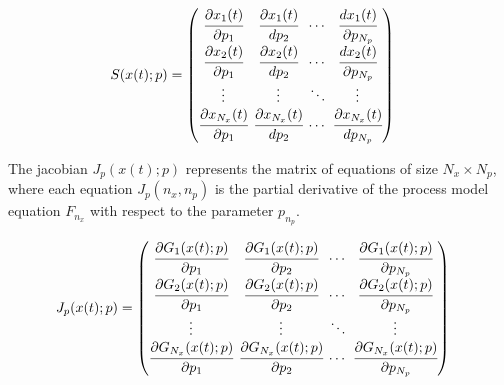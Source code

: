 \documentclass[../Article_Model_Parameters.tex]{subfiles}
\begin{document}
	{\footnotesize
		\begin{equation}
			\begin{split}
				{S}({x}(t);{p}) & = 
				\begingroup %
				\setlength\arraycolsep{2pt}
				\begin{pmatrix}
					\cfrac{\partial {x_{1}}(t)}{\partial {p_{1}}} 	& \cfrac{\partial {x_{1}}(t)}{d {p_{2}}}     & \cdots & \cfrac{d {x_{1}}(t)}{\partial {p_{N_p}}}\\
					\cfrac{\partial {x_{2}}(t)}{\partial {p_{1}}} 	& \cfrac{\partial {x_{2}}(t)}{d {p_{2}}}     & \cdots & \cfrac{d {x_{2}}(t)}{\partial {p_{N_p}}}\\
					\vdots					 	    & \vdots 					   	  & \ddots & \vdots\\
					\cfrac{\partial {x_{N_x}}(t)}{\partial {p_{1}}} 	& \cfrac{\partial {x_{N_x}}(t)}{d {p_{2}}}     & \cdots & \cfrac{\partial {x_{N_x}}(t)}{d {p_{N_p}}}
				\end{pmatrix} 
				\endgroup
			\end{split}
	\end{equation} }
	
	The jacobian ${J_p}({x}(t);{p})$ represents the matrix of equations of size $N_x \times N_p$, where each equation ${J_p}(n_x,n_p)$ is the partial derivative of the process model equation $F_{n_x}$ with respect to the parameter $p_{n_p}$.
	
	{\footnotesize
		\begin{align}
			{J_p}({x}(t);{p}) & =
			\begingroup %
			\setlength\arraycolsep{2pt}
			\begin{pmatrix}
				\cfrac{\partial {G_{1}}({x}(t);{p})}{\partial {p_{1}}} & \cfrac{\partial {G_{1}}({x}(t);{p})}{\partial {p_{2}}} & \cdots & \cfrac{\partial {G_{1}}({x}(t);{p})}{\partial {p_{N_p}}}\\
				\cfrac{\partial {G_{2}}({x}(t);{p})}{\partial {p_{1}}} & \cfrac{\partial {G_{2}}({x}(t);{p})}{\partial {p_{2}}} & \cdots & \cfrac{\partial {G_{2}}({x}(t);{p})}{\partial {p_{N_p}}}\\
				\vdots & \vdots & \ddots & \vdots\\
				\cfrac{\partial {G_{N_x}}({x}(t);{p})}{\partial {p_{1}}} & \cfrac{\partial {G_{N_x}}({x}(t);{p})}{\partial {p_{2}}} & \cdots & \cfrac{\partial {G_{N_x}}({x}(t);{p})}{\partial {p_{N_p}}}
			\end{pmatrix}
			\endgroup
	\end{align}}
	
\end{document}
